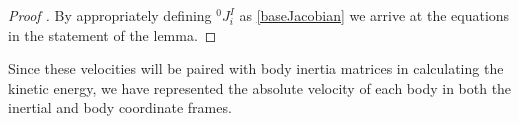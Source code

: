 \documentclass[lettersize,journal]{IEEEtran}
\def \m  {\mathfrak{m}}
\def \Ad {\textbf{Ad}}
\theoremstyle{remark}
\begin{document}
\begin{proof}[Proof ]

By appropriately defining $^0J_i^I$ as \eqref{baseJacobian} we arrive at the equations in the statement of the lemma.
\end{proof}
Since these velocities will be paired with body inertia matrices in calculating the kinetic energy, we have represented the absolute velocity of each body in both the inertial and body coordinate frames. %
\end{document}
